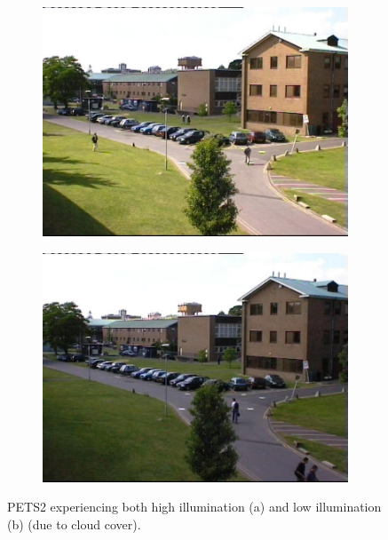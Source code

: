 \documentclass[12pt]{report}
\begin{document}
\begin{figure}
\centering
\begin{subfigure}{.48\linewidth}
  \includegraphics[width=1\linewidth]{figures/PETS2_highv.jpg}
  \caption{}
  \label{fig:sub1}
\end{subfigure}
\hfill
\begin{subfigure}{.48\linewidth}
  \includegraphics[width=1\linewidth]{figures/PETS2_lowv.jpg}
  \caption{}
  \label{fig:sub2}
\end{subfigure}
\caption{PETS2 experiencing both high illumination (a) and low illumination (b) (due to cloud cover).}
\label{fig:pets2illum}
\end{figure}
\end{document}
